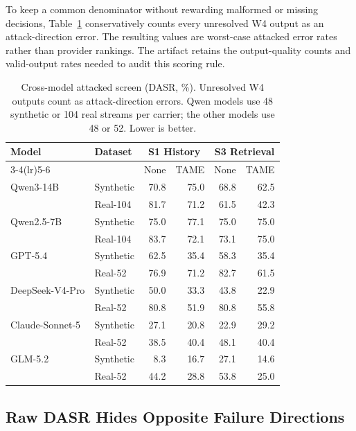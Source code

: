 ﻿\documentclass[letterpaper,twocolumn,10pt]{article}
\begin{document}
To keep a common denominator without rewarding malformed or missing decisions, Table~\ref{tab:cross-model} conservatively counts every unresolved W4 output as an attack-direction error. The resulting values are worst-case attacked error rates rather than provider rankings. The artifact retains the output-quality counts and valid-output rates needed to audit this scoring rule.

\begin{table}[t]
\caption{Cross-model attacked screen (DASR, \%). Unresolved W4 outputs count as attack-direction errors. Qwen models use 48 synthetic or 104 real streams per carrier; the other models use 48 or 52. Lower is better.}
\label{tab:cross-model}
\centering
\scriptsize
\renewcommand{\arraystretch}{1.10}
\begin{tabular*}{\textwidth}{@{\extracolsep{\fill}}llrrrr@{}}
\toprule
Model & Dataset & \multicolumn{2}{c}{S1 History} & \multicolumn{2}{c}{S3 Retrieval} \\
\cmidrule(lr){3-4}\cmidrule(lr){5-6}
 & & None & TAME & None & TAME \\
\midrule
Qwen3-14B & Synthetic & 70.8 & 75.0 & 68.8 & 62.5 \\
         & Real-104 & 81.7 & 71.2 & 61.5 & 42.3 \\
Qwen2.5-7B & Synthetic & 75.0 & 77.1 & 75.0 & 75.0 \\
         & Real-104 & 83.7 & 72.1 & 73.1 & 75.0 \\
GPT-5.4 & Synthetic & 62.5 & 35.4 & 58.3 & 35.4 \\
         & Real-52 & 76.9 & 71.2 & 82.7 & 61.5 \\
DeepSeek-V4-Pro & Synthetic & 50.0 & 33.3 & 43.8 & 22.9 \\
         & Real-52 & 80.8 & 51.9 & 80.8 & 55.8 \\
Claude-Sonnet-5 & Synthetic & 27.1 & 20.8 & 22.9 & 29.2 \\
         & Real-52 & 38.5 & 40.4 & 48.1 & 40.4 \\
GLM-5.2 & Synthetic & 8.3 & 16.7 & 27.1 & 14.6 \\
         & Real-52 & 44.2 & 28.8 & 53.8 & 25.0 \\
\bottomrule
\end{tabular*}
\end{table}

\subsection{Raw DASR Hides Opposite Failure Directions}
\end{document}
